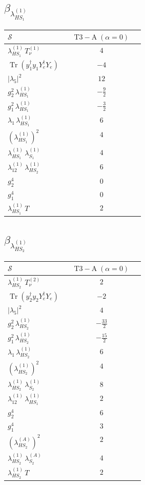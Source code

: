 \documentclass[9pt]{article}
\begin{document}
\subsection*{$ \beta_{\lambda_{HS_1}^{(1)}} $}
\begin{longtable}{@{}p{0.31\linewidth}c@{}}
\toprule
$\mathcal{S}$ & $ \mathrm{T3-A}\;(\alpha=0) $ \\
\midrule
$ \lambda_{HS_1}^{(1)}\,T_{\nu}^{(1)} $ & $ 4 $ \\
$ \operatorname{Tr}(y_1^\dagger y_1Y_e^\dagger Y_e) $ & $ -4 $ \\
$ |\lambda_5|^2 $ & $ 12 $ \\
$ g_2^2\,\lambda_{HS_1}^{(1)} $ & $ - \frac{9}{2} $ \\
$ g_1^2\,\lambda_{HS_1}^{(1)} $ & $ - \frac{3}{2} $ \\
$ \lambda_1\,\lambda_{HS_1}^{(1)} $ & $ 6 $ \\
$ \left(\lambda_{HS_1}^{(1)}\right)^2 $ & $ 4 $ \\
$ \lambda_{HS_1}^{(1)}\,\lambda_{S_1}^{(1)} $ & $ 4 $ \\
$ \lambda_{12}^{(1)}\,\lambda_{HS_2}^{(1)} $ & $ 6 $ \\
$ g_2^4 $ & $ 0 $ \\
$ g_1^4 $ & $ 0 $ \\
$ \lambda_{HS_1}^{(1)}\,T $ & $ 2 $ \\
\bottomrule
\end{longtable}
\subsection*{$ \beta_{\lambda_{HS_2}^{(1)}} $}
\begin{longtable}{@{}p{0.31\linewidth}c@{}}
\toprule
$\mathcal{S}$ & $ \mathrm{T3-A}\;(\alpha=0) $ \\
\midrule
$ \lambda_{HS_2}^{(1)}\,T_{\nu}^{(2)} $ & $ 2 $ \\
$ \operatorname{Tr}(y_2^\dagger y_2Y_e^\dagger Y_e) $ & $ -2 $ \\
$ |\lambda_5|^2 $ & $ 4 $ \\
$ g_2^2\,\lambda_{HS_2}^{(1)} $ & $ - \frac{33}{2} $ \\
$ g_1^2\,\lambda_{HS_2}^{(1)} $ & $ - \frac{15}{2} $ \\
$ \lambda_1\,\lambda_{HS_2}^{(1)} $ & $ 6 $ \\
$ \left(\lambda_{HS_2}^{(1)}\right)^2 $ & $ 4 $ \\
$ \lambda_{HS_2}^{(1)}\,\lambda_{S_2}^{(1)} $ & $ 8 $ \\
$ \lambda_{12}^{(1)}\,\lambda_{HS_1}^{(1)} $ & $ 2 $ \\
$ g_2^4 $ & $ 6 $ \\
$ g_1^4 $ & $ 3 $ \\
$ \left(\lambda_{HS_2}^{(A)}\right)^2 $ & $ 2 $ \\
$ \lambda_{HS_2}^{(1)}\,\lambda_{S_2}^{(A)} $ & $ 4 $ \\
$ \lambda_{HS_2}^{(1)}\,T $ & $ 2 $ \\
\bottomrule
\end{longtable}
\end{document}
